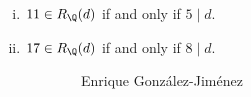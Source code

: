 \begin{frame}[plain]
\begin{prop} \hfill
	\begin{enumerate}[(i)]
	\item $11 \in R_\Q(d)$ if and only if $5 \mid d$.
	\item $17 \in R_\Q(d)$ if and only if $8 \mid d$.
	\end{enumerate}
\end{prop}
	\begin{figure}[h]
	\centering
	\begin{subfigure}{0.35\textwidth}
	\captionsetup{labelformat=empty}
	\centering
	\caption{Enrique Gonz\'alez-Jim\'enez}
	\end{subfigure}
	\begin{subfigure}{0.3\textwidth}
	\captionsetup{labelformat=empty}
	\centering

\end{subfigure}
\end{figure}
\end{frame}

